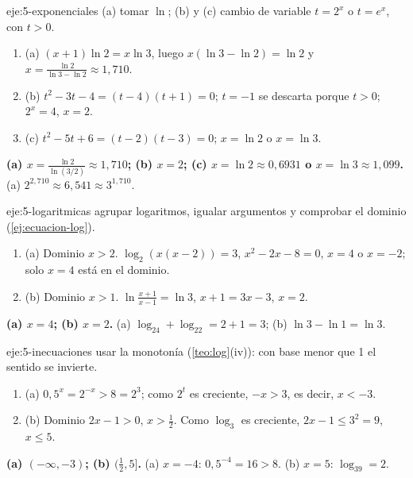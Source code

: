 \begin{solucion}{eje:5-exponenciales}
\planteamiento (a) tomar $\ln$; (b) y (c) cambio de variable $t=2^x$ o $t=e^x$, con $t>0$.
\pasos
\begin{enumerate}[label=\arabic*.]
  \item (a) $(x+1)\ln2=x\ln3$, luego $x(\ln3-\ln2)=\ln2$ y $x=\frac{\ln2}{\ln3-\ln2}\approx1{,}710$.
  \item (b) $t^2-3t-4=(t-4)(t+1)=0$; $t=-1$ se descarta porque $t>0$; $2^x=4$, $x=2$.
  \item (c) $t^2-5t+6=(t-2)(t-3)=0$; $x=\ln2$ o $x=\ln3$.
\end{enumerate}
\resultado \textbf{(a) $x=\frac{\ln2}{\ln(3/2)}\approx1{,}710$; (b) $x=2$; (c) $x=\ln2\approx0{,}6931$ o $x=\ln3\approx1{,}099$.}
\comprobacion (a) $2^{2{,}710}\approx6{,}541\approx3^{1{,}710}$.
\end{solucion}

\begin{solucion}{eje:5-logaritmicas}
\planteamiento agrupar logaritmos, igualar argumentos y comprobar el dominio (\cref{ej:ecuacion-log}).
\pasos
\begin{enumerate}[label=\arabic*.]
  \item (a) Dominio $x>2$. $\log_2(x(x-2))=3$, $x^2-2x-8=0$, $x=4$ o $x=-2$; solo $x=4$ está en el dominio.
  \item (b) Dominio $x>1$. $\ln\frac{x+1}{x-1}=\ln3$, $x+1=3x-3$, $x=2$.
\end{enumerate}
\resultado \textbf{(a) $x=4$; (b) $x=2$.}
\comprobacion (a) $\log_24+\log_22=2+1=3$; (b) $\ln3-\ln1=\ln3$.
\end{solucion}

\begin{solucion}{eje:5-inecuaciones}
\planteamiento usar la monotonía (\cref{teo:log}(iv)): con base menor que 1 el sentido se invierte.
\pasos
\begin{enumerate}[label=\arabic*.]
  \item (a) $0{,}5^x=2^{-x}>8=2^3$; como $2^t$ es creciente, $-x>3$, es decir, $x<-3$.
  \item (b) Dominio $2x-1>0$, $x>\frac12$. Como $\log_3$ es creciente, $2x-1\le3^2=9$, $x\le5$.
\end{enumerate}
\resultado \textbf{(a) $(-\infty,-3)$; (b) $\bigl(\frac12,5\bigr]$.}
\comprobacion (a) $x=-4$: $0{,}5^{-4}=16>8$. (b) $x=5$: $\log_39=2$.
\end{solucion}

